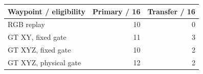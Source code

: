 \begin{tabular}{lrr}
\toprule
Waypoint / eligibility & Primary / 16 & Transfer / 16 \\
\midrule
RGB replay & 10 & 0 \\
GT XY, fixed gate & 11 & 3 \\
GT XYZ, fixed gate & 10 & 2 \\
GT XYZ, physical gate & 12 & 2 \\
\bottomrule
\end{tabular}

